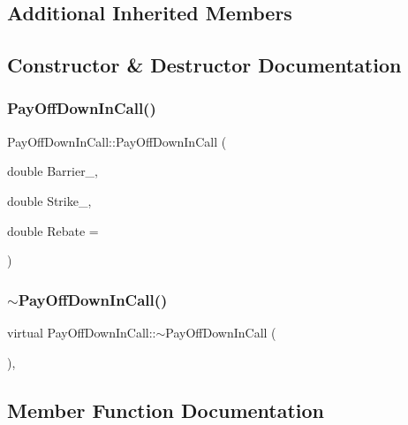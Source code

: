\subsection*{Additional Inherited Members}


\subsection{Constructor \& Destructor Documentation}
\hypertarget{classPayOffDownInCall_ab3815b315c2216e362e3e0db8e71c50c}{}\label{classPayOffDownInCall_ab3815b315c2216e362e3e0db8e71c50c} 
\subsubsection{\texorpdfstring{Pay\+Off\+Down\+In\+Call()}{PayOffDownInCall()}}
{\footnotesize\ttfamily Pay\+Off\+Down\+In\+Call\+::\+Pay\+Off\+Down\+In\+Call (\begin{DoxyParamCaption}\item[{double}]{Barrier\+\_\+,  }\item[{double}]{Strike\+\_\+,  }\item[{double}]{Rebate = {} }\end{DoxyParamCaption})}

\hypertarget{classPayOffDownInCall_af5c5e261b40e91c3e3a94d346bd9ed97}{}\label{classPayOffDownInCall_af5c5e261b40e91c3e3a94d346bd9ed97} 
\subsubsection{\texorpdfstring{$\sim$\+Pay\+Off\+Down\+In\+Call()}{~PayOffDownInCall()}}
{\footnotesize\ttfamily virtual Pay\+Off\+Down\+In\+Call\+::$\sim$\+Pay\+Off\+Down\+In\+Call (\begin{DoxyParamCaption}{ }\end{DoxyParamCaption})\hspace{0.3cm}{\ttfamily [inline]}, {\ttfamily [virtual]}}



\subsection{Member Function Documentation}
\hypertarget{classPayOffDownInCall_a2e8bda4a06ef878d1344a8752e04b7df}{}\label{classPayOffDownInCall_a2e8bda4a06ef878d1344a8752e04b7df} 
